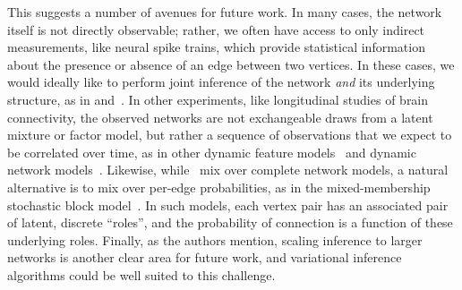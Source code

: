 This suggests a number of avenues for future work.  In many cases, the
network itself is not directly observable; rather, we often have
access to only indirect measurements, like neural spike trains, which
provide statistical information about the presence or absence of an
edge between two vertices.  In these cases, we would ideally like to
perform joint inference of the network \emph{and} its underlying
structure, as in \citet{linderman2014discovering}
and~\citet{linderman2016bayesian}.  In other experiments, like
longitudinal studies of brain connectivity, the observed networks are
not exchangeable draws from a latent mixture or factor model, but
rather a sequence of observations that we expect to be correlated over
time, as in other dynamic feature
models~\citep[e.g.][]{blei2006dynamic} and dynamic network
models~\citep[e.g.][]{bassett2011dynamic, linderman2014framework}.
Likewise, while~\citet{durante2016nonparametric} mix
over complete network models, a natural alternative is to mix over
per-edge probabilities, as in the mixed-membership stochastic block
model~\citep{airoldi2008mixed}. In such models, each vertex pair
has an associated pair of latent, discrete ``roles'', and the probability
of connection is a function of these underlying roles.  
Finally, as the authors mention, scaling inference to larger networks
is another clear area for future work, and variational inference
algorithms could be well suited to this challenge. 












































